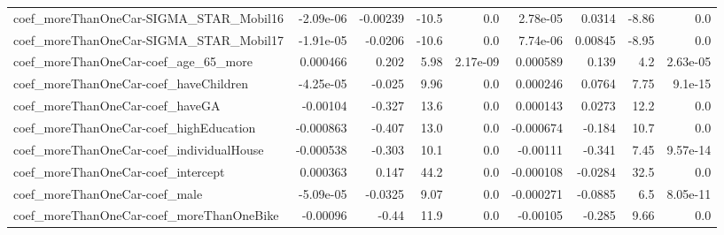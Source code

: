 \begin{tabular}{lrrrrrrrr}
coef_moreThanOneCar-SIGMA_STAR_Mobil16 & -2.09e-06 & -0.00239 & -10.5 & 0.0 & 2.78e-05 & 0.0314 & -8.86 & 0.0 \\
coef_moreThanOneCar-SIGMA_STAR_Mobil17 & -1.91e-05 & -0.0206 & -10.6 & 0.0 & 7.74e-06 & 0.00845 & -8.95 & 0.0 \\
coef_moreThanOneCar-coef_age_65_more & 0.000466 & 0.202 & 5.98 & 2.17e-09 & 0.000589 & 0.139 & 4.2 & 2.63e-05 \\
coef_moreThanOneCar-coef_haveChildren & -4.25e-05 & -0.025 & 9.96 & 0.0 & 0.000246 & 0.0764 & 7.75 & 9.1e-15 \\
coef_moreThanOneCar-coef_haveGA & -0.00104 & -0.327 & 13.6 & 0.0 & 0.000143 & 0.0273 & 12.2 & 0.0 \\
coef_moreThanOneCar-coef_highEducation & -0.000863 & -0.407 & 13.0 & 0.0 & -0.000674 & -0.184 & 10.7 & 0.0 \\
coef_moreThanOneCar-coef_individualHouse & -0.000538 & -0.303 & 10.1 & 0.0 & -0.00111 & -0.341 & 7.45 & 9.57e-14 \\
coef_moreThanOneCar-coef_intercept & 0.000363 & 0.147 & 44.2 & 0.0 & -0.000108 & -0.0284 & 32.5 & 0.0 \\
coef_moreThanOneCar-coef_male & -5.09e-05 & -0.0325 & 9.07 & 0.0 & -0.000271 & -0.0885 & 6.5 & 8.05e-11 \\
coef_moreThanOneCar-coef_moreThanOneBike & -0.00096 & -0.44 & 11.9 & 0.0 & -0.00105 & -0.285 & 9.66 & 0.0 \\
\end{tabular}
